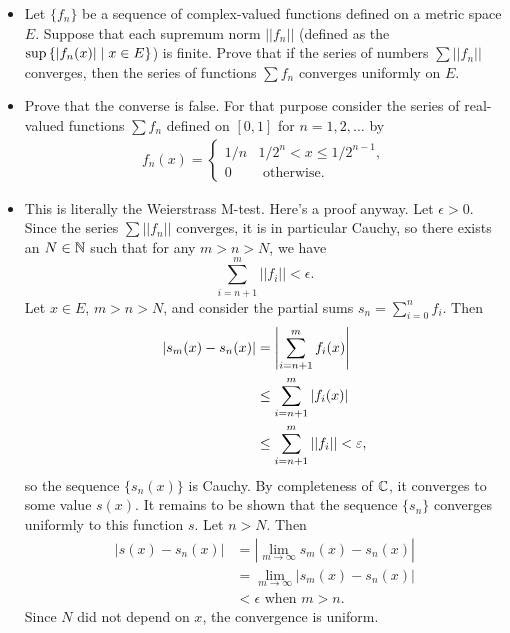 \begin{problem}
\begin{itemize}
    \item[(a)] Let $\{f_n\}$ be a sequence of complex-valued functions defined on a metric space $E$. Suppose that each supremum norm $||f_n||$ (defined as the $\sup\left\{ |f_n(x)| \mid x \in E\right\}$) is finite. Prove that if the series of numbers $\sum ||f_n||$ converges, then the series of functions $\sum f_n$ converges uniformly on $E$.
    \item[(b)] Prove that the converse is false. For that purpose consider the series of real-valued functions $\sum f_n$ defined on $[0,1]$ for $n=1,2,\ldots$ by
    \begin{align*}
        f_n(x) = \begin{cases}
        1/n & 1/2^n < x \le 1/2^{n-1}, \\
        0 & \text{ otherwise}.
        \end{cases}
    \end{align*}
\end{itemize}
\begin{solution}
\begin{itemize}
    \item[(a)] This is literally the Weierstrass M-test. Here's a proof anyway. Let $\epsilon > 0$. Since the series $\sum ||f_n||$ converges, it is in particular Cauchy, so there exists an $N \in \mathbb{N}$ such that for any $m > n > N$, we have
    $$ \sum_{i=n+1}^m ||f_i|| < \epsilon. $$
    Let $x \in E$, $m > n > N$, and consider the partial sums $s_n = \sum_{i=0}^n f_i$. Then
    \begin{align*}
        |s_m(x) - s_n(x)| &= \left\lvert \sum_{i=n+1}^m f_i(x)\right\rvert \\
        &\leq \sum_{i=n+1}^m |f_i(x)| \\
        &\leq \sum_{i=n+1}^m ||f_i|| < \varepsilon,
    \end{align*}
    so the sequence $\{s_n(x)\}$ is Cauchy. By completeness of $\mathbb{C}$, it converges to some value $s(x)$. It remains to be shown that the sequence $\{s_n\}$ converges uniformly to this function $s$. Let $n > N$. Then
    \begin{align*}
        |s(x) - s_n(x)| &= |\lim_{m \to \infty} s_m(x) - s_n(x)| \\
        &= \lim_{m \to \infty} |s_m(x) - s_n(x)| \\
        &< \epsilon \text{ when } m > n.
    \end{align*}
    Since $N$ did not depend on $x$, the convergence is uniform.
    

\end{itemize}
\end{solution}
\end{problem}
